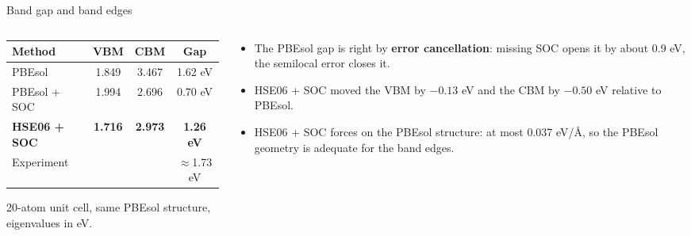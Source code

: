 \documentclass[aspectratio=169,10pt]{beamer}
\begin{document}
\begin{frame}{Band gap and band edges}
  \small
  \begin{columns}[T]
    \begin{column}{0.5\textwidth}
      \begin{tabular}{lccc}
        \toprule
        Method & VBM & CBM & Gap \\
        \midrule
        PBEsol & 1.849 & 3.467 & 1.62 eV \\
        PBEsol + SOC & 1.994 & 2.696 & 0.70 eV \\
        \textbf{HSE06 + SOC} & \textbf{1.716} & \textbf{2.973} & \textbf{1.26 eV} \\
        Experiment & & & $\approx$1.73 eV \\
        \bottomrule
      \end{tabular}

      \vspace{0.3em}
      \scriptsize 20-atom unit cell, same PBEsol structure, eigenvalues in eV.
    \end{column}
    \begin{column}{0.47\textwidth}
      \begin{itemize}
        \item The PBEsol gap is right by \textbf{error cancellation}: missing SOC opens it by about 0.9 eV, the semilocal error closes it.
        \item HSE06 + SOC moved the VBM by $-0.13$ eV and the CBM by $-0.50$ eV relative to PBEsol.
        \item HSE06 + SOC forces on the PBEsol structure: at most 0.037 eV/\AA, so the PBEsol geometry is adequate for the band edges.
      \end{itemize}
    \end{column}
  \end{columns}
\end{frame}
\end{document}
